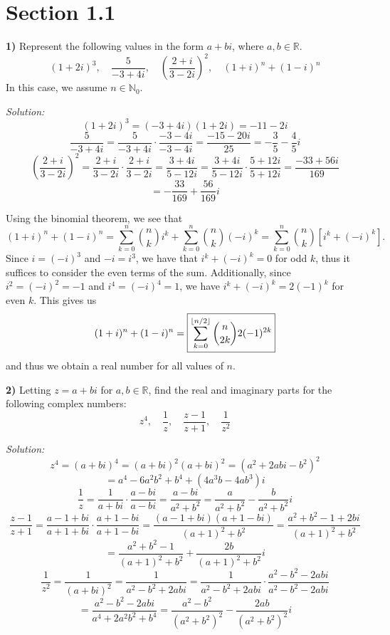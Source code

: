 \documentclass[12pt]{article}
\newcommand{\N}{\ensuremath{\mathbb{N}}}
\newcommand{\R}{\ensuremath{\mathbb{R}}}
\newcommand{\bracketb}[1]{\left[#1\right]}
\newcommand{\parenb}[1]{\left(#1\right)}
\DeclarePairedDelimiter\floor{\lfloor}{\rfloor}
\newcommand{\solution}{\textit{Solution: }}
\begin{document}
\pagestyle{fancy}

\setlength{\parindent}{0in}
\setlength{\parskip}{0.1in}

\section*{Section 1.1}

\textbf{1)} Represent the following values in the form \( a + bi \), where
\( a, b \in \R\).
\[
	(1 + 2i)^3, \quad
	\frac{5}{-3 + 4i}, \quad
	\parenb{ \frac{2 + i}{3 - 2i} }^2, \quad
	(1 + i)^n + (1 - i)^n
\]
In this case, we assume \( n \in \N_0 \).

\solution
\[ (1 + 2i)^3 = (-3 + 4i)(1 + 2i) = \boxed{-11 - 2i} \]
\[
	\frac{5}{-3 + 4i} =
	\frac{5}{-3 + 4i} \cdot \frac{-3 - 4i}{-3 - 4i} =
	\frac{-15 - 20i}{25} =
	\boxed{-\frac{3}{5} - \frac{4}{5}i}
\]
\[
	\parenb{\frac{2 + i}{3 - 2i}}^2 =
	\frac{2 + i}{3 - 2i} \cdot \frac{2 + i}{3 - 2i} =
	\frac{3 + 4i}{5 - 12i} =
	\frac{3 + 4i}{5 - 12i} \cdot \frac{5 + 12i}{5 + 12i} =
	\frac{-33 + 56i}{169}
\]
\[ = \boxed{-\frac{33}{169} + \frac{56}{169}i} \]

Using the binomial theorem, we see that
\[
	(1 + i)^n + (1 - i)^n
	= \sum_{k = 0}^n \binom{n}{k}i^k + \sum_{k = 0}^n \binom{n}{k}(-i)^k
	= \sum_{k = 0}^n \binom{n}{k} \bracketb{i^k + (-i)^k}.
\]
Since \( i = (-i)^3 \) and \( -i = i^3 \), we have that
\( i^k + (-i)^k = 0 \) for odd \( k \), thus it suffices to consider the even
terms of the sum.
Additionally, since \( i^2 = (-i)^2 = -1 \) and \( i^4 = (-i)^4 = 1 \), we have
\( i^k + (-i)^k = 2(-1)^k \) for even \( k \).
This gives us
\[
	(1 + i)^n + (1 - i)^n
	= \boxed{\sum_{k = 0}^{\floor{n/2}} \binom{n}{2k} 2(-1)^{2k}}
\]
and thus we obtain a real number for all values of \( n \).

\textbf{2)} Letting \( z = a + bi \) for \( a,b \in \R \), find the real and
imaginary parts for the following complex numbers:
\[
	z^4, \quad
	\frac{1}{z}, \quad
	\frac{z - 1}{z + 1}, \quad
	\frac{1}{z^2}
\]

\solution
\[
	z^4 = (a + bi)^4 = (a + bi)^2 (a + bi)^2 = (a^2 + 2abi - b^2)^2
\]
\[
	= \boxed{a^4 - 6a^2b^2 + b^4 + (4a^3b  - 4ab^3)i}
\]
\[
	\frac{1}{z} = \frac{1}{a + bi} \cdot \frac{a - bi}{a - bi}
	= \frac{a - bi}{a^2 + b^2}
	= \boxed{\frac{a}{a^2 + b^2} - \frac{b}{a^2 + b^2}i}
\]
\[
	\frac{z - 1}{z + 1} = \frac{a - 1 + bi}{a + 1 + bi}
	\cdot \frac{a + 1 - bi}{a + 1 - bi}
	= \frac{(a - 1 + bi)(a + 1 - bi)}{(a + 1)^2 + b^2}
	= \frac{a^2 + b^2 - 1 + 2bi}{(a + 1)^2 + b^2}
\]
\[
	= \boxed{
		\frac{a^2 + b^2 - 1}{(a + 1)^2 + b^2}
		+ \frac{2b}{(a + 1)^2 + b^2}i
	}
\]
\[
	\frac{1}{z^2} = \frac{1}{(a + bi)^2} = \frac{1}{a^2 - b^2 + 2abi}
	= \frac{1}{a^2 - b^2 + 2abi}
	\cdot \frac{a^2 - b^2 - 2abi}{a^2 - b^2 - 2abi}
\]
\[
	= \frac{a^2 - b^2 - 2abi}{a^4 + 2a^2b^2 + b^4}
	= \boxed{
		\frac{a^2 - b^2}{(a^2 + b^2)^2} - \frac{2ab}{(a^2 + b^2)^2}i
	}
\]
\end{document}
